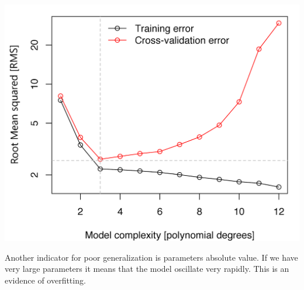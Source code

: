 \documentclass[../main.tex]{subfiles}
\begin{document}
\begin{center}
    \includegraphics[scale=0.25]{images/error_complexity.png}
\end{center}

Another indicator for poor generalization is parameters absolute value. If we have very large parameters it means that the model oscillate very rapidly. This is an evidence of overfitting.
\end{document}
